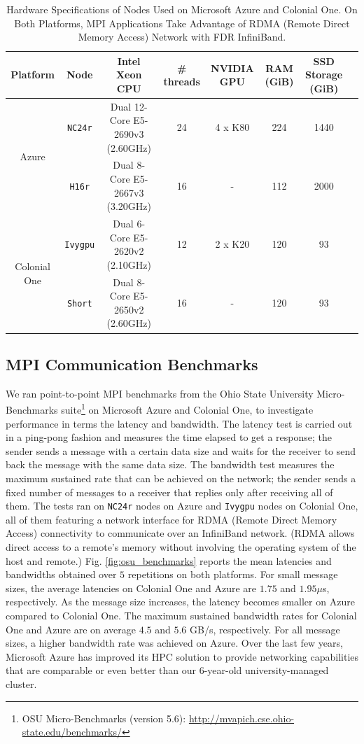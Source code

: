 \documentclass[10pt,journal,compsoc]{IEEEtran}
\begin{document}
\begin{table}[b]
    \renewcommand{\arraystretch}{1.5}
    \caption{Hardware Specifications of Nodes Used on Microsoft Azure and Colonial One. On Both Platforms, MPI Applications Take Advantage of RDMA (Remote Direct Memory Access) Network with FDR InfiniBand.}
    \label{tab:hw_specs}
    \centering
    \begin{tabular}{cccccccc}
        Platform & Node & Intel Xeon CPU & \# threads & NVIDIA GPU & RAM (GiB) & SSD Storage (GiB) \\
        \hline
        \multirow{2}{*}{Azure} & \texttt{NC24r} & Dual 12-Core E5-2690v3 (2.60GHz) & 24 & 4 x K80 & 224 & 1440 \\
        & \texttt{H16r} & Dual 8-Core E5-2667v3 (3.20GHz) & 16 & - & 112 & 2000 \\
        \hline
        \multirow{2}{*}{Colonial One} & \texttt{Ivygpu} & Dual 6-Core E5-2620v2 (2.10GHz) & 12 & 2 x K20 & 120 & 93 \\
        & \texttt{Short} & Dual 8-Core E5-2650v2 (2.60GHz) & 16 & - & 120 & 93 \\
        \hline
    \end{tabular}
\end{table}

\subsection{MPI Communication Benchmarks}\label{subsec:mpi_benchmarks}

We ran point-to-point MPI benchmarks from the Ohio State University Micro-Benchmarks suite\footnote{OSU Micro-Benchmarks (version 5.6): \url{http://mvapich.cse.ohio-state.edu/benchmarks/}} on Microsoft Azure and Colonial One, to investigate performance in terms the latency and bandwidth.
The latency test is carried out in a ping-pong fashion and measures the time elapsed to get a response; the sender sends a message with a certain data size and waits for the receiver to send back the message with the same data size.
The bandwidth test measures the maximum sustained rate that can be achieved on the network; the sender sends a fixed number of messages to a receiver that replies only after receiving all of them.
The tests ran on \texttt{NC24r} nodes on Azure and \texttt{Ivygpu} nodes on Colonial One, all of them featuring a network interface for RDMA (Remote Direct Memory Access) connectivity to communicate over an InfiniBand network.
(RDMA allows direct access to a remote's memory without involving the operating system of the host and remote.)
Fig. \ref{fig:osu_benchmarks} reports the mean latencies and bandwidths obtained over $5$ repetitions on both platforms.
For small message sizes, the average latencies on Colonial One and Azure are $1.75$ and $1.95 \mu $s, respectively.
As the message size increases, the latency becomes smaller on Azure compared to Colonial One.
The maximum sustained bandwidth rates for Colonial One and Azure are on average $4.5$ and $5.6$ GB/s, respectively.
For all message sizes, a higher bandwidth rate was achieved on Azure.
Over the last few years, Microsoft Azure has improved its HPC solution to provide networking capabilities that are comparable or even better than our 6-year-old university-managed cluster.
\end{document}
